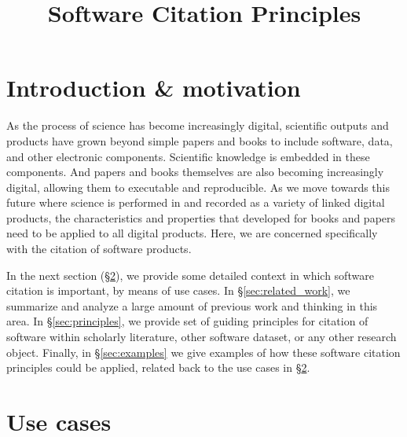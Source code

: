 \documentclass[11pt, oneside]{amsart}
\title{Software Citation Principles}
\author{}
\date{}
\begin{document}
\begin{abstract}
\end{abstract}

\maketitle


\section{Introduction \& motivation}
\label{sec:intro}

As the process of science has become increasingly digital, scientific outputs and products have
grown beyond simple papers and books to include software, data, and other electronic
components.  Scientific knowledge is embedded in these components.  And papers and books
themselves are also becoming increasingly digital, allowing them to executable
and reproducible.  As we move towards this future where science is performed in and recorded
as a variety of linked digital products, the characteristics and properties that developed for
books and papers need to be applied to all digital products.  Here, we are concerned specifically
with the citation of software products.

In the next section (\S\ref{sec:use_cases}), we provide some detailed context in which
software citation is important, by means of use cases.  In \S\ref{sec:related_work}, we
summarize and analyze a large amount of previous work and thinking in this area.  In
\S\ref{sec:principles}, we provide set of guiding principles for citation of software within
scholarly literature, other software dataset, or any other research object.  Finally,
in \S\ref{sec:examples} we give examples of how these software citation principles
could be applied, related back to the use cases in \S\ref{sec:use_cases}.

\section{Use cases}
\label{sec:use_cases}
\end{document}
